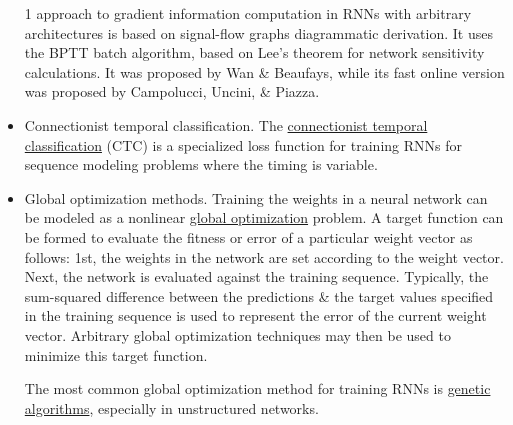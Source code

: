 \documentclass{article}
\begin{document}
\begin{itemize}
	1 approach to gradient information computation in RNNs with arbitrary architectures is based on signal-flow graphs diagrammatic derivation. It uses the BPTT batch algorithm, based on {\sc Lee}'s theorem for network sensitivity calculations. It was proposed by {\sc Wan \& Beaufays}, while its fast online version was proposed by {\sc Campolucci, Uncini, \& Piazza}.
	\item {\sf Connectionist temporal classification.} The \href{https://en.wikipedia.org/wiki/Connectionist_temporal_classification}{connectionist temporal classification} (CTC) is a specialized loss function for training RNNs for sequence modeling problems where the timing is variable.
	\item {\sf Global optimization methods.} Training the weights in a neural network can be modeled as a nonlinear \href{https://en.wikipedia.org/wiki/Global_optimization}{global optimization} problem. A target function can be formed to evaluate the fitness or error of a particular weight vector as follows: 1st, the weights in the network are set according to the weight vector. Next, the network is evaluated against the training sequence. Typically, the sum-squared difference between the predictions \& the target values specified in the training sequence is used to represent the error of the current weight vector. Arbitrary global optimization techniques may then be used to minimize this target function.
	
	The most common global optimization method for training RNNs is \href{https://en.wikipedia.org/wiki/Genetic_algorithm}{genetic algorithms}, especially in unstructured networks.
	

\end{itemize}
\end{document}
